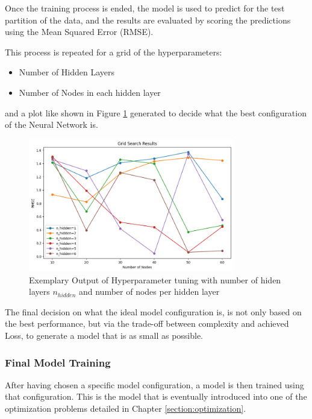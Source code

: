 Once the training process is ended, the model is used to predict for the test partition of the data, and the results are evaluated by scoring the predictions using the Mean Squared Error (RMSE). 

This process is repeated for a grid of the hyperparameters:
\begin{itemize}
	\item Number of Hidden Layers
	\item Number of Nodes in each hidden layer
\end{itemize}

and a plot like shown in Figure	\ref{fig:hyperparm} generated to decide what the best configuration of the Neural Network is. 

\begin{figure}[h] 
	\centering
	\includegraphics[width=0.8\textwidth]{figures/modelling/hyperparm.png} 
	\caption{Exemplary Output of Hyperparameter tuning with number of hiden layers $n_{hidden} $ and number of nodes per hidden layer}
	\label{fig:hyperparm}
\end{figure}

The final decision on what the ideal model configuration is, is not only based on the best performance, but via the trade-off between complexity and achieved Loss, to generate a model that is as small as possible.


\subsubsection{Final Model Training}

After having chosen a specific model configuration, a model is then trained using that configuration. This is the model that is eventually introduced into one of the optimization problems detailed in Chapter \ref{section:optimization}.

